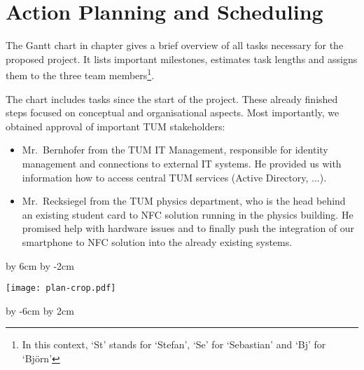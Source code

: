\section{Action Planning and Scheduling}\label{sec:plan}





The Gantt chart in chapter gives a brief overview of all tasks necessary for the proposed project.
It lists important milestones, estimates task lengths and assigns them to the three team members\footnote{In this context, `St' stands for `Stefan', `Se' for `Sebastian' and `Bj' for `Björn'}.

The chart includes tasks since the start of the project.
These already finished steps focused on conceptual and organisational aspects.
Most importantly, we obtained approval of important TUM stakeholders:
\begin{itemize}
\item Mr.~Bernhofer from the TUM IT Management, responsible for identity management and connections to external IT systems. He provided us with information how to access central TUM services (Active Directory, ...).
\item Mr.~Recksiegel from the TUM physics department, who is the head behind an existing student card to NFC solution running in the physics building. He promised help with hardware issues and to finally push the integration of our smartphone to NFC solution into the already existing systems.
\end{itemize}










\par\vfill\break %

\advance\vsize by 6cm %
\advance\voffset by -2cm %
\centerline{\texttt{[image: plan-crop.pdf]}}
\par\vfill\break %

\advance\vsize by -6cm %
\advance\voffset by 2cm %